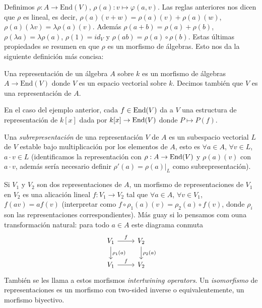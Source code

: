 \documentclass[ANAyTR.tex]{subfiles}
\begin{document}
Definimos $\rho:A\to \mathrm{End}(V)$, $\rho(a): v\mapsto\varphi(a,v)$. Las reglas anteriores nos dicen que $\rho$ es lineal, es decir, $\rho(a)(v+w)=\rho(a)(v)+\rho(a)(w)$, $\rho(a)(\lambda v)=\lambda\rho(a)(v)$. Además $\rho(a+b)=\rho(a)+\rho(b)$, $\rho(\lambda a)=\lambda\rho(a)$, $\rho(1)=id_V$ y $\rho(ab)=\rho(a)\circ\rho(b)$. Estas últimas propiedades se resumen en que $\rho$ es un morfismo de álgebras. Esto nos da la siguiente definición más concisa:

\begin{defi}
Una representación de un álgebra $A$ sobre $k$ es un morfismo de álgebras $A\to\mathrm{End}(V)$ donde $V$ es un espacio vectorial sobre $k$. Decimos también que $V$ es una representación de $A$.
\end{defi}

En el caso del ejemplo anterior, cada $f\in\operatorname{End}(V)$ da a $V$ una estructura de representación de $k[x]$ dada por $k[x]\to\operatorname{End}(V)$ donde $P\mapsto P(f)$. 

\begin{defi}
Una \emph{subrepresentación} de una representación $V$ de $A$ es un subespacio vectorial $L$ de $V$ estable bajo multiplicación por los elementos de $A$, esto es $\forall a\in A$, $\forall v\in L$, $a\cdot v\in L$ (identificamos la representación con $\rho:A\to\operatorname{End}(V)$ y $\rho(a)(v)$ con $a\cdot v$, además sería necesario definir $\rho'(a)=\rho(a)|_L$ como subrepresentación). 
\end{defi}

\begin{defi}
Si $V_1$ y $V_2$ son dos representaciones de $A$, un morfismo de representaciones de $V_1$ en $V_2$ es una alicación lineal $f:V_1\to V_2$ tal que $\forall a\in A$, $\forall v\in V_1$, $f(av)=af(v)$ (interpretar como $f\circ \rho_1(a)(v)=\rho_2(a)\circ f(v)$, donde $\rho_i$ son las representaciones correspondientes). Más guay si lo pensamos com ouna transformación natural: para todo $a\in A$ este diagrama conmuta
\[
\begin{tikzcd}
V_1\arrow[r, "f"]\arrow[d, "\rho_1(a)"] & V_2\arrow[d, "\rho_2(a)"]\\
V_1 \arrow[r, "f"] & V_2
\end{tikzcd}
\]
También se les llama a estos morfismos \emph{intertwining operators}. Un \emph{isomorfismo} de representaciones es un morfismo con two-sided inverse o equivalentemente, un morfismo biyectivo. 
\end{defi}
\end{document}
